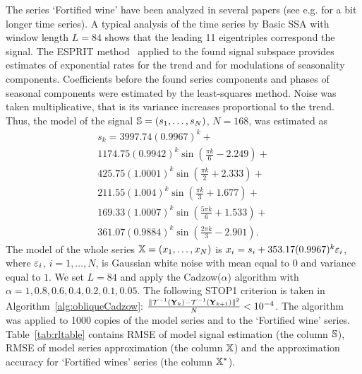 \documentclass[sii]{ipart}
\begin{document}
The series `Fortified wine' have been analyzed in several papers (see e.g. \cite{Golyandina.etal2015} for a bit longer time series).
A typical analysis of the time series by Basic SSA with window length $L=84$ shows that the leading 11 eigentriples
correspond the signal. The ESPRIT method~\cite{Roy.Kailath1989,Golyandina.Zhigljavsky2012} applied to the found signal subspace provides
estimates of exponential rates for the trend and for modulations of seasonality components.
Coefficients before the found series components and phases of seasonal components were estimated by
the least-squares method. Noise was taken multiplicative, that is its variance increases proportional to the trend.
Thus, the model of the signal $\mathbb{S} = (s_{1}, \ldots, s_N)$, $N=168$, was estimated as
%
%
\begin{multline*}
s_{k} = 3997.74 (0.9967)^k + \\
1174.75 (0.9942)^k \sin(\frac{\pi k}{6} - 2.249) + \\
425.75 (1.0001)^k \sin(\frac{\pi k}{2} + 2.333) + \\
211.55 (1.004)^k \sin(\frac{\pi k}{3} + 1.677) + \\
169.33 (1.0007)^k \sin(\frac{5 \pi k}{6} + 1.533) + \\
361.07 (0.9884)^k \sin(\frac{2 \pi k}{3} - 2.901).
\end{multline*}
The model of the whole series $\mathbb{X}=(x_1,\ldots,x_N)$ is $x_i=s_i + 353.17 (0.9967)^k \varepsilon_i$,
where  $\varepsilon_i$, $i=1,\ldots,N$,  is Gaussian white noise with mean equal to $0$ and variance equal to $1$.
We set $L=84$ and apply the Cadzow($\alpha$) algorithm with $\alpha=1, 0.8, 0.6, 0.4, 0.2, 0.1, 0.05$.
The following STOP1 criterion is taken in Algorithm~\ref{alg:obliqueCadzow}:
$\frac{\|\mathcal{T}^{-1}(\mathbf{Y}_k) - \mathcal{T}^{-1}(\mathbf{Y}_{k + 1})\|^2}{N} < 10^{-4}$.
The algorithm was applied to 1000 copies of the model series and to the `Fortified wine' series.
Table~\ref{tab:rltable} contains RMSE of model signal estimation (the column $\mathbb{S}$),
RMSE of model series approximation (the column $\mathbb{X}$) and the approximation accuracy for
`Fortified wines' series (the column $\mathbb{X}^*$).
\end{document}

